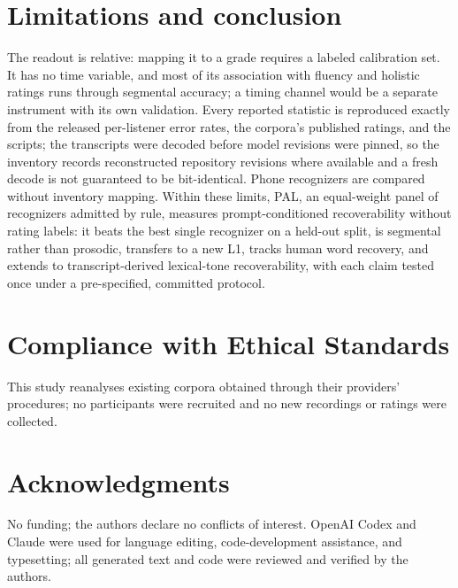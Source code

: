 \section{Limitations and conclusion}
\label{sec:conclusion}
The readout is relative: mapping it to a grade requires a labeled
calibration set. It has no time variable, and most of its
association with fluency and holistic ratings runs through segmental
accuracy; a timing channel would be a separate instrument with its own
validation. Every reported statistic is reproduced exactly from the released per-listener error rates, the
corpora's published ratings, and the scripts; the transcripts
were decoded before model revisions were pinned, so the inventory records
reconstructed repository revisions where available and a fresh decode is
not guaranteed to be bit-identical. Phone recognizers are compared
without inventory mapping. Within these limits, PAL, an
equal-weight panel of  recognizers admitted by rule, measures
prompt-conditioned recoverability without rating labels: it beats the best
single recognizer on a held-out split, is segmental rather than prosodic,
transfers to a new L1, tracks human word recovery, and extends to transcript-derived
lexical-tone recoverability, with each claim tested once under a
pre-specified, committed protocol.

\section{Compliance with Ethical Standards}
This study reanalyses existing corpora obtained through their providers'
procedures; no participants were recruited and no new recordings or ratings
were collected.

\section{Acknowledgments}
No funding; the authors declare no conflicts of interest. OpenAI Codex and
Claude were used for language editing, code-development assistance, and
typesetting; all generated text and code were reviewed and verified by the
authors.
